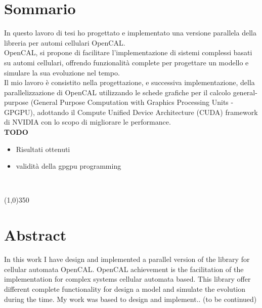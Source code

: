 
\cleardoublepage
{}
{}
\begingroup
\let\clearpage\relax
\let\cleardoublepage\relax
\let\cleardoublepage\relax

\chapter*{Sommario}



In questo lavoro di tesi ho progettato e implementato una versione parallela della libreria per automi cellulari OpenCAL.\\
OpenCAL, si propone di facilitare l'implementazione di sistemi complessi basati su automi cellulari, offrendo funzionalit\`a complete per progettare un modello e simulare la sua evoluzione nel tempo. \\
Il mio lavoro \`e consistito nella progettazione, e successiva implementazione, della parallelizzazione di OpenCAL utilizzando le schede grafiche per il calcolo general-purpose (General Purpose Computation with Graphics Processing Units - GPGPU), adottando il Compute Unified Device Architecture (CUDA) framework
di NVIDIA con lo scopo di migliorare le performance.\\

\textbf {TODO}
\begin{itemize}
\item Risultati ottenuti
\item validità della gpgpu programming
\end{itemize}



\hfill \\
\begin{center}
\line(1,0){350} 
\end{center}

\chapter*{Abstract}

In this work I have design and implemented a parallel version of the library for cellular automata OpenCAL. OpenCAL achievement is the facilitation of the implementation for complex systems cellular automata based. This library offer different complete functionality for design a model and simulate the evolution during the time. My work was based to design and implement.. (to be continued)

\endgroup			



